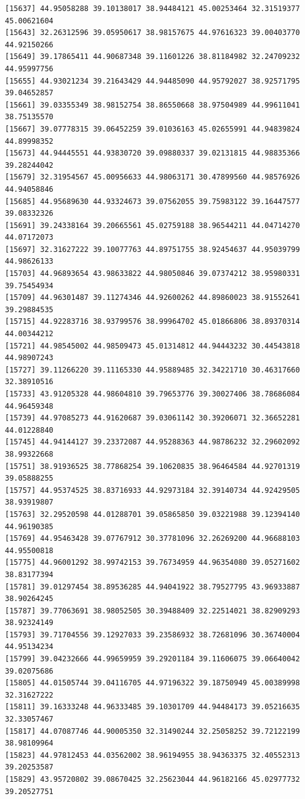 \documentclass[
  letterpaper,
  DIV=11,
  numbers=noendperiod]{scrartcl}
\begin{document}
\begin{verbatim}
[15637] 44.95058288 39.10138017 38.94484121 45.00253464 32.31519377 45.00621604
[15643] 32.26312596 39.05950617 38.98157675 44.97616323 39.00403770 44.92150266
[15649] 39.17865411 44.90687348 39.11601226 38.81184982 32.24709232 44.95997756
[15655] 44.93021234 39.21643429 44.94485090 44.95792027 38.92571795 39.04652857
[15661] 39.03355349 38.98152754 38.86550668 38.97504989 44.99611041 38.75135570
[15667] 39.07778315 39.06452259 39.01036163 45.02655991 44.94839824 44.89998352
[15673] 44.94445551 44.93830720 39.09880337 39.02131815 44.98835366 39.28244042
[15679] 32.31954567 45.00956633 44.98063171 30.47899560 44.98576926 44.94058846
[15685] 44.95689630 44.93324673 39.07562055 39.75983122 39.16447577 39.08332326
[15691] 39.24338164 39.20665561 45.02759188 38.96544211 44.04714270 44.07172073
[15697] 32.31627222 39.10077763 44.89751755 38.92454637 44.95039799 44.98626133
[15703] 44.96893654 43.98633822 44.98050846 39.07374212 38.95980331 39.75454934
[15709] 44.96301487 39.11274346 44.92600262 44.89860023 38.91552641 39.29884535
[15715] 44.92283716 38.93799576 38.99964702 45.01866806 38.89370314 44.00344212
[15721] 44.98545002 44.98509473 45.01314812 44.94443232 30.44543818 44.98907243
[15727] 39.11266220 39.11165330 44.95889485 32.34221710 30.46317660 32.38910516
[15733] 43.91205328 44.98604810 39.79653776 39.30027406 38.78686084 44.96459348
[15739] 44.97085273 44.91620687 39.03061142 30.39206071 32.36652281 44.01228840
[15745] 44.94144127 39.23372087 44.95288363 44.98786232 32.29602092 38.99322668
[15751] 38.91936525 38.77868254 39.10620835 38.96464584 44.92701319 39.05888255
[15757] 44.95374525 38.83716933 44.92973184 32.39140734 44.92429505 38.93919807
[15763] 32.29520598 44.01288701 39.05865850 39.03221988 39.12394140 44.96190385
[15769] 44.95463428 39.07767912 30.37781096 32.26269200 44.96688103 44.95500818
[15775] 44.96001292 38.99742153 39.76734959 44.96354080 39.05271602 38.83177394
[15781] 39.01297454 38.89536285 44.94041922 38.79527795 43.96933887 38.90264245
[15787] 39.77063691 38.98052505 30.39488409 32.22514021 38.82909293 38.92324149
[15793] 39.71704556 39.12927033 39.23586932 38.72681096 30.36740004 44.95134234
[15799] 39.04232666 44.99659959 39.29201184 39.11606075 39.06640042 39.02075686
[15805] 44.01505744 39.04116705 44.97196322 39.18750949 45.00389998 32.31627222
[15811] 39.16333248 44.96333485 39.10301709 44.94484173 39.05216635 32.33057467
[15817] 44.07087746 44.90005350 32.31490244 32.25058252 39.72122199 38.98109964
[15823] 44.97812453 44.03562002 38.96194955 38.94363375 32.40552313 39.20253587
[15829] 43.95720802 39.08670425 32.25623044 44.96182166 45.02977732 39.20527751

\end{verbatim}
\end{document}

